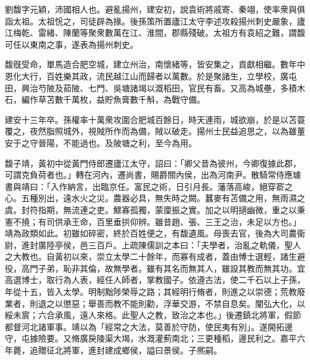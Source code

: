 \begin{pinyinscope}
 
 
 劉馥字元穎，沛國相人也。避亂揚州，建安初，說袁術將戚寄、秦翊，使率衆與俱詣太祖。太祖恱之，司徒辟為掾。後孫策所置廬江太守李述攻殺揚州刺史嚴象，廬江梅乾、雷緒、陳蘭等聚衆數萬在江、淮間，郡縣殘破。太祖方有袁紹之難，謂馥可任以東南之事，遂表為揚州刺史。
 
 
 
 
 馥旣受命，單馬造合肥空城，建立州治，南懷緒等，皆安集之，貢獻相繼。數年中恩化大行，百姓樂其政，流民越江山而歸者以萬數。於是聚諸生，立學校，廣屯田，興治芍陂及茹陂、七門、吳塘諸堨以溉稻田，官民有畜。又高為城壘，多積木石，編作草苫數千萬枚，益貯魚膏數千斛，為戰守備。
 
 
 
 
 建安十三年卒。孫權率十萬衆攻圍合肥城百餘日，時天連雨，城欲崩，於是以苫蓑覆之，夜然脂照城外，視賊所作而為備，賊以破走。揚州士民益追思之，以為雖董安于之守晉陽，不能過也。及陂塘之利，至今為用。
 
 
 
 
 馥子靖，黃初中從黃門侍郎遷廬江太守，詔曰：「卿父昔為彼州，今卿復據此郡，可謂克負荷者也。」轉在河內，遷尚書，賜爵關內侯，出為河南尹。散騎常侍應璩書與靖曰：「入作納言，出臨京任。富民之術，日引月長。藩落高峻，絕穿窬之心。五種別出，遠水火之災。農器必具，無失時之闕。蠶麥有苫備之用，無雨濕之虞。封符指期，無流連之吏。鰥寡孤獨，蒙廩振之實。加之以明擿幽微，重之以秉憲不撓；有司供承王命，百里垂拱仰辨。雖昔趙、張、三王之治，未足以方也。」靖為政類如此。初雖如碎密，終於百姓便之，有馥遺風。母喪去官，後為大司農衞尉，進封廣陸亭侯，邑三百戶。上疏陳儒訓之本曰：「夫學者，治亂之軌儀，聖人之大教也。自黃初以來，崇立太學二十餘年，而寡有成者，蓋由愽士選輕，諸生避役，高門子弟，恥非其倫，故無學者。雖有其名而無其人，雖設其教而無其功。宜高選博士，取行為人表，經任人師者，掌教國子。依遵古法，使二千石以上子孫，年從十五，皆入太學。明制黜陟榮辱之路；其經明行脩者，則進之以崇德；荒教廢業者，則退之以懲惡；舉善而教不能則勸，浮華交游，不禁自息矣。闡弘大化，以綏未賔；六合承風，遠人來格。此聖人之教，致治之本也。」後遷鎮北將軍，假節都督河北諸軍事。靖以為「經常之大法，莫善於守防，使民夷有別」。遂開拓邊守，屯據險要。又脩廣戾陵渠大堨，水溉灌薊南北；三更種稻，邊民利之。嘉平六年薨，追贈征北將軍，進封建成鄉侯，謚曰景侯。子熈嗣。
 
 
 
 
\end{pinyinscope}